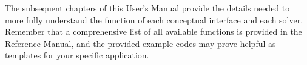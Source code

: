 The subsequent chapters of this User's Manual provide the details
needed to more fully understand the function of each conceptual
interface and each solver.  Remember that a comprehensive list of all
available functions is provided in the \hypre{} Reference Manual, and
the provided example codes may prove helpful as templates for your
specific application.




